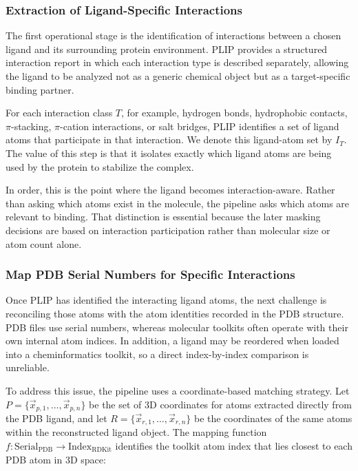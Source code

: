\documentclass[a4paper,12pt]{article}
\begin{document}
\subsubsection{Extraction of Ligand-Specific Interactions}
The first operational stage is the identification of interactions between a
chosen ligand and its surrounding protein environment. PLIP provides a
structured interaction report in which each interaction type is described
separately, allowing the ligand to be analyzed not as a generic chemical object
but as a target-specific binding partner.

For each interaction class $T$, for example, hydrogen bonds, hydrophobic
contacts, $\pi$-stacking, $\pi$-cation interactions, or salt bridges, PLIP
identifies a set of ligand atoms that participate in that interaction. We denote
this ligand-atom set by $I_T$. The value of this step is that it isolates
exactly which ligand atoms are being used by the protein to stabilize the
complex.

In order, this is the point where the ligand becomes
interaction-aware. Rather than asking which atoms exist in the
molecule, the pipeline asks which atoms are relevant to binding. That
distinction is essential because the later masking decisions are based on
interaction participation rather than molecular size or atom count alone.

\subsubsection{Map PDB Serial Numbers for Specific Interactions}

Once PLIP has identified the interacting ligand atoms, the next challenge is
reconciling those atoms with the atom identities recorded in the PDB structure.
PDB files use serial numbers, whereas molecular toolkits often operate with
their own internal atom indices. In addition, a ligand may be reordered when
loaded into a cheminformatics toolkit, so a direct index-by-index comparison is
unreliable.

To address this issue, the pipeline uses a coordinate-based matching
strategy. Let $P = \{\vec{x}_{p,1}, \ldots, \vec{x}_{p,n}\}$ be the set of
3D coordinates for atoms extracted directly from the PDB ligand, and let
$R = \{\vec{x}_{r,1}, \ldots, \vec{x}_{r,n}\}$ be the coordinates of the same
atoms within the reconstructed ligand object. The mapping function
$f: \text{Serial}_{\text{PDB}} \to \text{Index}_{\text{RDKit}}$ identifies the
toolkit atom index that lies closest to each PDB atom in 3D space:
\end{document}
